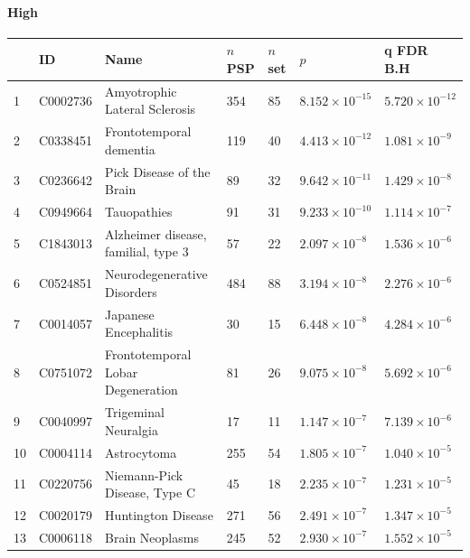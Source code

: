 \paragraph{High}
\begin{table}[ht]
\centering

\setlength{\extrarowheight}{2pt}
\begin{adjustbox}{width=\textwidth}

\begin{tabular}{lllllll}
  \toprule
 & ID & Name & $n$ PSP & $n$ set & $p$ & q FDR B.H \\ 
  \midrule
1 & C0002736 & Amyotrophic Lateral Sclerosis & 354 & 85 & $8.152 \times 10^{-15}$ & $5.720 \times 10^{-12}$ \\ 
  2 & C0338451 & Frontotemporal dementia & 119 & 40 & $4.413 \times 10^{-12}$ & $1.081 \times 10^{-9}$ \\ 
  3 & C0236642 & Pick Disease of the Brain & 89 & 32 & $9.642 \times 10^{-11}$ & $1.429 \times 10^{-8}$ \\ 
  4 & C0949664 & Tauopathies & 91 & 31 & $9.233 \times 10^{-10}$ & $1.114 \times 10^{-7}$ \\ 
  5 & C1843013 & Alzheimer disease, familial, type 3 & 57 & 22 & $2.097 \times 10^{-8}$ & $1.536 \times 10^{-6}$ \\ 
  6 & C0524851 & Neurodegenerative Disorders & 484 & 88 & $3.194 \times 10^{-8}$ & $2.276 \times 10^{-6}$ \\ 
  7 & C0014057 & Japanese Encephalitis & 30 & 15 & $6.448 \times 10^{-8}$ & $4.284 \times 10^{-6}$ \\ 
  8 & C0751072 & Frontotemporal Lobar Degeneration & 81 & 26 & $9.075 \times 10^{-8}$ & $5.692 \times 10^{-6}$ \\ 
  9 & C0040997 & Trigeminal Neuralgia & 17 & 11 & $1.147 \times 10^{-7}$ & $7.139 \times 10^{-6}$ \\ 
  10 & C0004114 & Astrocytoma & 255 & 54 & $1.805 \times 10^{-7}$ & $1.040 \times 10^{-5}$ \\ 
  11 & C0220756 & Niemann-Pick Disease, Type C & 45 & 18 & $2.235 \times 10^{-7}$ & $1.231 \times 10^{-5}$ \\ 
  12 & C0020179 & Huntington Disease & 271 & 56 & $2.491 \times 10^{-7}$ & $1.347 \times 10^{-5}$ \\ 
  13 & C0006118 & Brain Neoplasms & 245 & 52 & $2.930 \times 10^{-7}$ & $1.552 \times 10^{-5}$ \\ 

\end{tabular}
\end{adjustbox}
\end{table}

